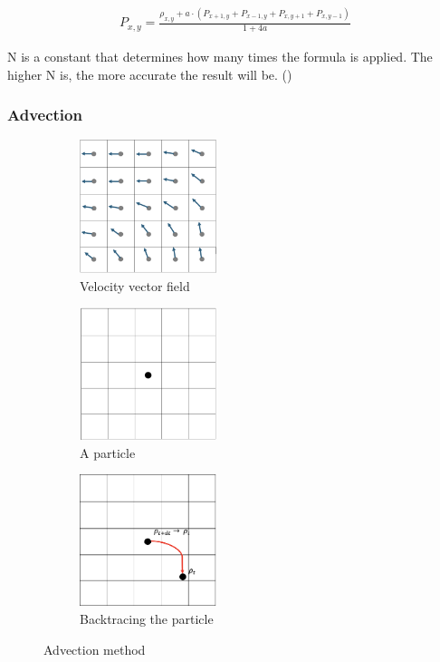 \documentclass[a4paper,12pt,titlepage]{article}
\begin{document}
\[
\begin{array}{ll}
	P_{x, y} = \frac{\rho_{x, y} + a \cdot (P_{x+1, y} + P_{x-1, y} + P_{x, y+1} + P_{x, y-1})}{1+4a}
\end{array}	
\]

N is a constant that determines how many times the formula is applied. The higher N is, the more accurate the result will be. (\cite{josstam})

\subsubsection{Advection}

\begin{figure}[H]
	\centering
	\begin{subfigure}{0.3\textwidth}
		\centering
		\includegraphics[width=4cm]{resources/advection1.png}
		\caption{Velocity vector field}
	\end{subfigure}
	\begin{subfigure}{0.3\textwidth}
		\centering
		\includegraphics[width=4cm]{resources/advection2.png}
		\caption{A particle}
		\label{fig:aparticle}
	\end{subfigure}
	\begin{subfigure}{0.3\textwidth}
		\centering
		\includegraphics[width=4cm]{resources/advection3.png}
		\caption{Backtracing the particle}
		\label{fig:backtrace}
	\end{subfigure}
	\caption {Advection method}
	\label{fig:advection}
\end{figure}
\end{document}
